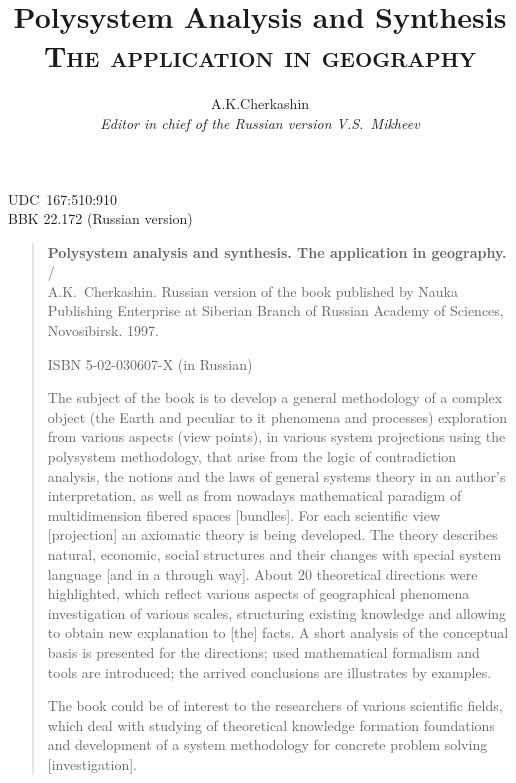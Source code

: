 \documentclass[12pt,leqno]{book}
\title{Polysystem Analysis and Synthesis\\\textsc{\small{} The application in geography}  }
\author{A.K.Cherkashin  \\
{\small\em Editor in chief of the Russian version V.S.~Mikheev }}
\date{ }
\numberwithin{equation}{chapter}
\begin{document}
\maketitle
{}
\newpage{}
\pagestyle{empty}
\noindent{}UDC~167:510:910\\{}
BBK 22.172 (Russian version)
\vfill
\begin{quote}
\small{}
\textbf{Polysystem analysis and synthesis. The application in geography.} /\\{}
A.K.~Cherkashin. Russian version of the book published by Nauka Publishing Enterprise at Siberian Branch of Russian Academy of Sciences, Novosibirsk. 1997.

ISBN 5-02-030607-X (in Russian)

The subject of the book is to develop a general methodology of a complex object (the Earth and peculiar to it phenomena and processes) exploration from various aspects (view points), in various system projections using the polysystem methodology, that arise from the logic of contradiction analysis, the notions and the laws of general systems theory in an author's interpretation, as well as from nowadays mathematical paradigm of multidimension fibered spaces [bundles]. For each scientific view [projection] an axiomatic theory is being developed. The theory describes natural, economic, social structures and their changes with special system language [and in a through way]. About 20 theoretical directions were highlighted, which reflect various aspects of geographical phenomena investigation of various scales, structuring existing knowledge and allowing to obtain new explanation to [the] facts. A short analysis of the conceptual basis is presented for the directions; used mathematical formalism and tools are introduced; the arrived conclusions are illustrates by examples.

The book could be of interest to the researchers of various scientific fields, which deal with studying of theoretical knowledge formation foundations and development of a system methodology for concrete problem solving [investigation].

\vspace{1em}


\end{quote}
\end{document}
